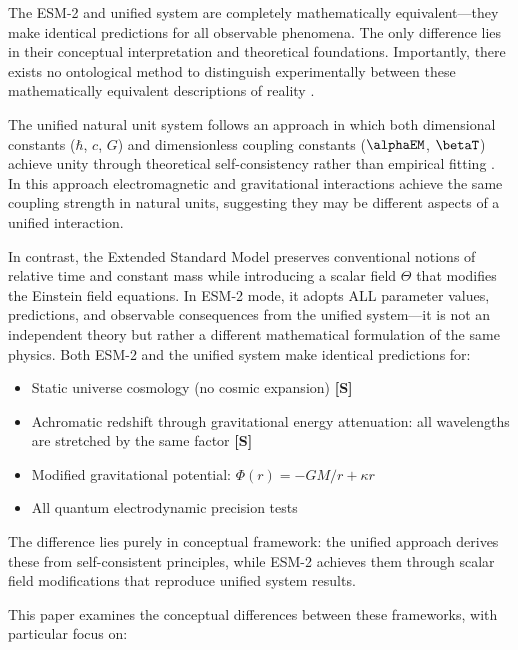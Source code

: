 	The ESM-2 and unified system are completely mathematically equivalent—they make identical predictions for all observable phenomena. The only difference lies in their conceptual interpretation and theoretical foundations. Importantly, there exists no ontological method to distinguish experimentally between these mathematically equivalent descriptions of reality \cite{Duhem1906,Quine1951}.
	
	The unified natural unit system follows an approach in which both dimensional constants ($\hbar$, $c$, $G$) and dimensionless coupling constants ($\alphaEM$, $\betaT$) achieve unity through theoretical self-consistency rather than empirical fitting \cite{pascher_beta_derivation_2025}. In this approach electromagnetic and gravitational interactions achieve the same coupling strength in natural units, suggesting they may be different aspects of a unified interaction.
	
	In contrast, the Extended Standard Model preserves conventional notions of relative time and constant mass while introducing a scalar field $\Theta$ that modifies the Einstein field equations. In ESM-2 mode, it adopts ALL parameter values, predictions, and observable consequences from the unified system—it is not an independent theory but rather a different mathematical formulation of the same physics. Both ESM-2 and the unified system make identical predictions for:
	
	\begin{itemize}
		\item Static universe cosmology (no cosmic expansion) \textbf{[S]}
		\item Achromatic redshift through gravitational energy attenuation: all wavelengths are stretched by the same factor \textbf{[S]}
		\item Modified gravitational potential: $\Phi(r) = -GM/r + \kappa r$
		\item All quantum electrodynamic precision tests \cite{pascher_muon_g2_2025}
	\end{itemize}
	
	The difference lies purely in conceptual framework: the unified approach derives these from self-consistent principles, while ESM-2 achieves them through scalar field modifications that reproduce unified system results.
	
	This paper examines the conceptual differences between these frameworks, with particular focus on:
	
